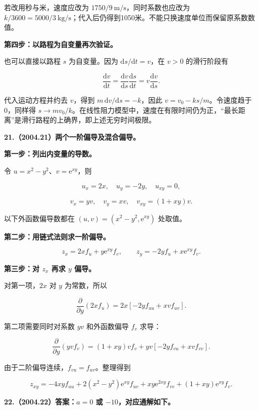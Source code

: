 \documentclass[UTF8,11pt,fontset=windows]{ctexart}
\begin{document}
若改用秒与米，速度应改为 $1750/9\ \mathrm{m/s}$，同时系数也应改为 $k/3600=5000/3\ \mathrm{kg/s}$；代入后仍得到1050米。不能只换速度单位而保留原系数数值。

\textbf{第四步：以路程为自变量再次验证。}

也可以直接以路程 $s$ 为自变量。因为 $\mathrm ds/\mathrm dt=v$，在 $v>0$ 的滑行阶段有

$$
\frac{\mathrm dv}{\mathrm dt}
=\frac{\mathrm dv}{\mathrm ds}\frac{\mathrm ds}{\mathrm dt}
=v\frac{\mathrm dv}{\mathrm ds}.
$$

代入运动方程并约去 $v$，得到 $m\,\mathrm dv/\mathrm ds=-k$，因此 $v=v_0-ks/m$。令速度趋于0，同样得 $s\to mv_0/k$。在线性阻力模型中，速度在有限时间仍为正，“最长距离”是滑行路程的上确界，即上述无穷时间极限。

\clearpage

\textbf{21.（2004.21）两个一阶偏导及混合偏导。}

\textbf{第一步：列出内变量的导数。}

令 $u=x^2-y^2$、$v=\mathrm e^{xy}$，则

$$
u_x=2x,\quad u_y=-2y,\quad u_{xy}=0,
$$

$$
v_x=yv,\quad v_y=xv,\quad v_{xy}=(1+xy)v.
$$

以下外函数偏导数都在 $(u,v)=(x^2-y^2,\mathrm e^{xy})$ 处取值。

\textbf{第二步：用链式法则求一阶偏导。}

$$
z_x=2x f_u+y\mathrm e^{xy}f_v,
\qquad
z_y=-2y f_u+x\mathrm e^{xy}f_v.
$$

\textbf{第三步：对 $z_x$ 再求 $y$ 偏导。}

对第一项，$2x$ 对 $y$ 为常数，所以

$$
\frac{\partial}{\partial y}(2x f_u)
=2x[-2y f_{uu}+xv f_{uv}].
$$

第二项需要同时对系数 $yv$ 和外函数偏导 $f_v$ 求导：

$$
\frac{\partial}{\partial y}(yv f_v)
=(1+xy)v f_v+yv[-2y f_{vu}+xv f_{vv}].
$$

由于二阶偏导连续，$f_{vu}=f_{uv}$。整理得到

$$
\boxed{
 z_{xy}=-4xy f_{uu}+2(x^2-y^2)\mathrm e^{xy}f_{uv}
 +xy\mathrm e^{2xy}f_{vv}+(1+xy)\mathrm e^{xy}f_v
}.
$$

\clearpage

\textbf{22.（2004.22）答案：$a=0$ 或 $-10$，对应通解如下。}
\end{document}
